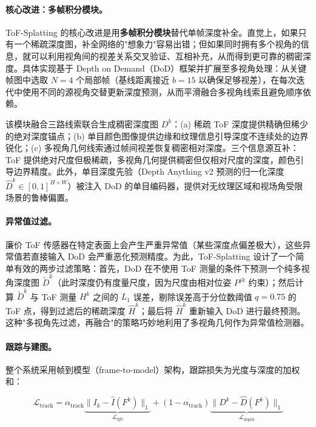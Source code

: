 \paragraph{核心改进：多帧积分模块。}ToF-Splatting 的核心改进是用\textbf{多帧积分模块}替代单帧深度补全。直觉上，如果只有一个稀疏深度图，补全网络的"想象力"容易出错；但如果同时拥有多个视角的信息，就可以利用视角间的视差关系交叉验证、互相补充，从而得到更可靠的稠密深度。具体实现基于 Depth on Demand（DoD）框架并扩展至多视角处理：从关键帧图中选取 $N = 4$ 个局部帧（基线距离接近 $b = 15$ 以确保足够视差），在每次迭代中使用不同的源视角交替更新深度预测，从而平滑融合多视角线索且避免顺序依赖。

该模块融合三路线索联合生成稠密深度图 $D^k$：(a) 稀疏 ToF 深度提供精确但稀少的绝对深度锚点；(b) 单目颜色图像提供边缘和纹理信息引导深度不连续处的边界锐化；(c) 多视角几何线索通过帧间视差恢复稠密相对深度。三个信息源互补：ToF 提供绝对尺度但极稀疏，多视角几何提供稠密但仅相对尺度的深度，颜色引导边界精度。此外，单目深度先验（Depth Anything v2 预测的归一化深度 $\hat{D}^k \in [0,1]^{H \times W}$）被注入 DoD 的单目编码器，提供对无纹理区域和视场角受限场景的鲁棒偏置。

\paragraph{异常值过滤。}廉价 ToF 传感器在特定表面上会产生严重异常值（某些深度点偏差极大），这些异常值若直接输入 DoD 会严重恶化预测精度。为此，ToF-Splatting 设计了一个简单有效的两步过滤策略：首先，DoD 在不使用 ToF 测量的条件下预测一个纯多视角深度图 $\tilde{D}^k$（此时深度仍有度量尺度，因为尺度由相对位姿 $P^{jk}$ 约束）；然后计算 $\tilde{D}^k$ 与 ToF 测量 $H^k$ 之间的 $L_1$ 误差，剔除误差高于分位数阈值 $q = 0.75$ 的 ToF 点，得到过滤后的稀疏深度 $\hat{H}^k$；最后将 $\hat{H}^k$ 重新输入 DoD 进行最终预测。这种"多视角先过滤，再融合"的策略巧妙地利用了多视角几何作为异常值检测器。

\paragraph{跟踪与建图。}整个系统采用帧到模型（frame-to-model）架构，跟踪损失为光度与深度的加权和：

\begin{equation}
\mathcal{L}_{\text{track}} = \alpha_{\text{track}} \underbrace{\|I_k - \hat{I}(F^k)\|_1}_{\mathcal{L}_{\text{rgb}}} + (1 - \alpha_{\text{track}}) \underbrace{\|D^k - \hat{D}(F^k)\|_1}_{\mathcal{L}_{\text{depth}}}
\end{equation}

